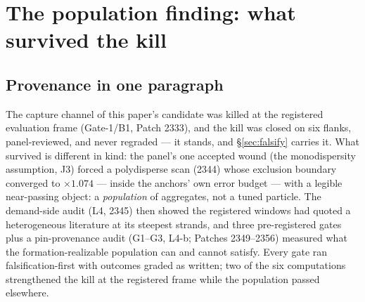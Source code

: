 
\section{The population finding: what survived the kill}\label{sec:population}

\subsection{Provenance in one paragraph}
The capture channel of this paper's candidate was killed at the registered
evaluation frame (Gate-1/B1, Patch 2333), and the kill was closed on six flanks,
panel-reviewed, and never regraded --- it stands, and \S\ref{sec:falsify} carries
it. What survived is different in kind: the panel's one accepted wound (the
monodispersity assumption, J3) forced a polydisperse scan (2344) whose exclusion
boundary converged to $\times 1.074$ --- inside the anchors' own error budget ---
with a legible near-passing object: a \emph{population} of aggregates, not a
tuned particle. The demand-side audit (L4, 2345) then showed the registered
windows had quoted a heterogeneous literature at its steepest strands, and three
pre-registered gates plus a pin-provenance audit (G1--G3, L4-b; Patches
2349--2356) measured what the formation-realizable population can and cannot
satisfy. Every gate ran falsification-first with outcomes graded as written; two
of the six computations strengthened the kill at the registered frame while the
population passed elsewhere.

